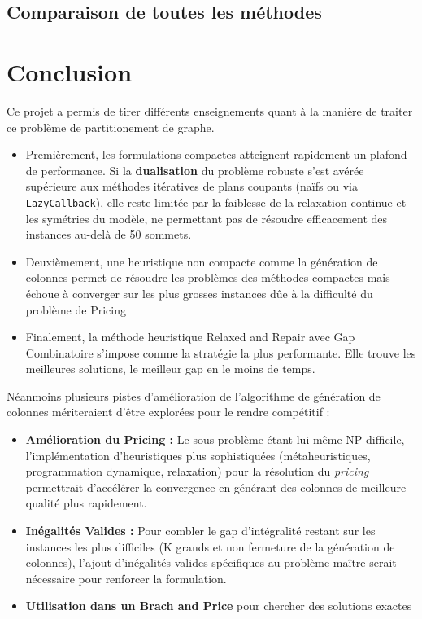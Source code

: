 \documentclass{article}
\begin{document}
\subsection{Comparaison de toutes les méthodes}

\section{Conclusion}

Ce projet a permis de tirer différents enseignements quant à la manière de traiter ce problème de partitionement de graphe.
\begin{itemize}
    \item Premièrement, les formulations compactes atteignent rapidement un plafond de performance. Si la \textbf{dualisation} du problème robuste s'est avérée supérieure aux méthodes itératives de plans coupants (naïfs ou via \texttt{LazyCallback}), elle reste limitée par la faiblesse de la relaxation continue et les symétries du modèle, ne permettant pas de résoudre efficacement des instances au-delà de 50 sommets.
    \item Deuxièmement, une heuristique non compacte comme la génération de colonnes permet de résoudre les problèmes des méthodes compactes mais échoue à converger sur les plus grosses instances dûe à la difficulté du problème de Pricing 
    \item Finalement, la méthode heuristique Relaxed and Repair avec Gap Combinatoire s'impose comme la stratégie la plus performante. Elle trouve les meilleures solutions, le meilleur gap en le moins de temps.
\end{itemize}




Néanmoins plusieurs pistes d'amélioration de l'algorithme de génération de colonnes mériteraient d'être explorées pour le rendre compétitif :
\begin{itemize}
    \item \textbf{Amélioration du Pricing :} Le sous-problème étant lui-même NP-difficile, l'implémentation d'heuristiques plus sophistiquées (métaheuristiques, programmation dynamique, relaxation) pour la résolution du \textit{pricing} permettrait d'accélérer la convergence en générant des colonnes de meilleure qualité plus rapidement.
    \item \textbf{Inégalités Valides :} Pour combler le gap d'intégralité restant sur les instances les plus difficiles (K grands et non fermeture de la génération de colonnes), l'ajout d'inégalités valides spécifiques au problème maître  serait nécessaire pour renforcer la formulation.
    \item \textbf{Utilisation dans un Brach and Price} pour chercher des solutions exactes
\end{itemize}
\newpage
\appendix
\end{document}
